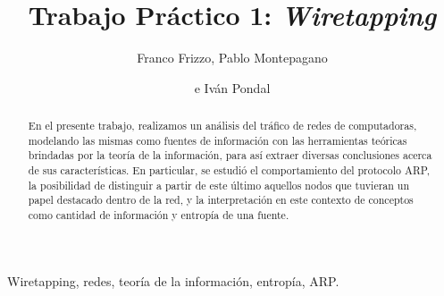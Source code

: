 \documentclass[%
    final,
    notitlepage,
    narroweqnarray,
    inline,
    twoside,
]{ieee}
\begin{document}
\title[Trabajo Práctico 1: Wiretapping]{%
       Trabajo Práctico 1: \emph{Wiretapping}}

\author[FRIZZO, MONTEPAGANO, PONDAL]{Franco Frizzo, Pablo Montepagano
\and{}e Iván Pondal}


\maketitle

\begin{abstract}
En el presente trabajo, realizamos un análisis del tráfico de redes de
computadoras, modelando las mismas como fuentes de información con las
herramientas teóricas brindadas por la teoría de la información, para así
extraer diversas conclusiones acerca de sus características.
En particular, se estudió el comportamiento del protocolo ARP, la
posibilidad de distinguir a partir de este último aquellos nodos que
tuvieran un papel destacado dentro de la red, y la interpretación
en este contexto de conceptos como cantidad de información y entropía de una
fuente.
\end{abstract}

\begin{keywords}
Wiretapping, redes, teoría de la información, entropía, ARP.
\end{keywords}








\end{document}
